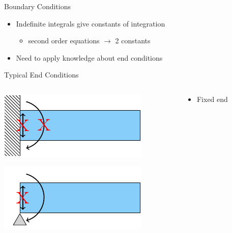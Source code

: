 \documentclass[10pt, svgnames]{beamer}
\begin{document}
\begin{frame}[label={sec:org2825d1e}]{Boundary Conditions}
\begin{itemize}
\item Indefinite integrals give constants of integration

\begin{itemize}
\item second order equations \(\rightarrow\) 2 constants
\end{itemize}

\item Need to apply knowledge about end conditions
\end{itemize}
\end{frame}

\begin{frame}[label={sec:org110effd}]{Typical End Conditions}
\begin{columns}
\begin{column}{0.5\columnwidth}
\begin{center}
\includegraphics[width=.9\linewidth]{pictures/fixed-end.pdf}
\end{center}

\begin{center}
\includegraphics[width=.9\linewidth]{pictures/simple-support.pdf}
\end{center}
\end{column}

\begin{column}{0.5\columnwidth}
\begin{itemize}
\item Fixed end


\end{itemize}
\end{column}
\end{columns}
\end{frame}
\end{document}
